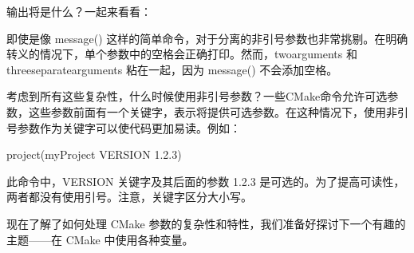 

输出将是什么？一起来看看：


即使是像 message() 这样的简单命令，对于分离的非引号参数也非常挑剔。在明确转义的情况下，单个参数中的空格会正确打印。然而，twoarguments 和 threeseparatearguments 粘在一起，因为 message() 不会添加空格。

考虑到所有这些复杂性，什么时候使用非引号参数？一些CMake命令允许可选参数，这些参数前面有一个关键字，表示将提供可选参数。在这种情况下，使用非引号参数作为关键字可以使代码更加易读。例如：

\begin{cmake}
project(myProject VERSION 1.2.3)
\end{cmake}

此命令中，VERSION 关键字及其后面的参数 1.2.3 是可选的。为了提高可读性，两者都没有使用引号。注意，关键字区分大小写。

现在了解了如何处理 CMake 参数的复杂性和特性，我们准备好探讨下一个有趣的主题——在 CMake 中使用各种变量。

















































































